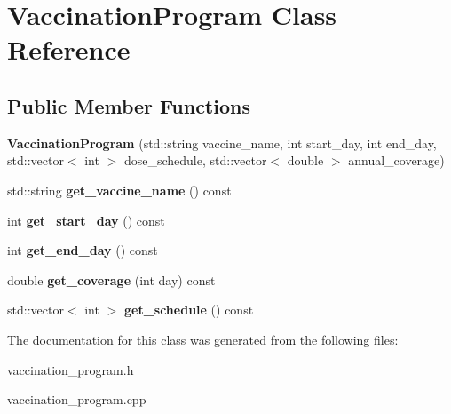 \hypertarget{class_vaccination_program}{}\section{Vaccination\+Program Class Reference}
\label{class_vaccination_program}
\subsection*{Public Member Functions}
\begin{DoxyCompactItemize}
\item 
\mbox{\label{class_vaccination_program_a787ba2c76543a229030d669a12b0a04d}} 
{\bfseries Vaccination\+Program} (std\+::string vaccine\+\_\+name, int start\+\_\+day, int end\+\_\+day, std\+::vector$<$ int $>$ dose\+\_\+schedule, std\+::vector$<$ double $>$ annual\+\_\+coverage)
\item 
\mbox{\label{class_vaccination_program_aaf1d552361713053bbe4af6bff36b086}} 
std\+::string {\bfseries get\+\_\+vaccine\+\_\+name} () const
\item 
\mbox{\label{class_vaccination_program_a59d0986e20a3f684648696b95d2e6047}} 
int {\bfseries get\+\_\+start\+\_\+day} () const
\item 
\mbox{\label{class_vaccination_program_a39ce6e8344fee4fad08f8c78c170db76}} 
int {\bfseries get\+\_\+end\+\_\+day} () const
\item 
\mbox{\label{class_vaccination_program_a1cb1e439ecc2267118ce189a9a439918}} 
double {\bfseries get\+\_\+coverage} (int day) const
\item 
\mbox{\label{class_vaccination_program_a964c7cba505991d10f9e65da985c802d}} 
std\+::vector$<$ int $>$ {\bfseries get\+\_\+schedule} () const
\end{DoxyCompactItemize}


The documentation for this class was generated from the following files\+:\begin{DoxyCompactItemize}
\item 
vaccination\+\_\+program.\+h\item 
vaccination\+\_\+program.\+cpp\end{DoxyCompactItemize}
